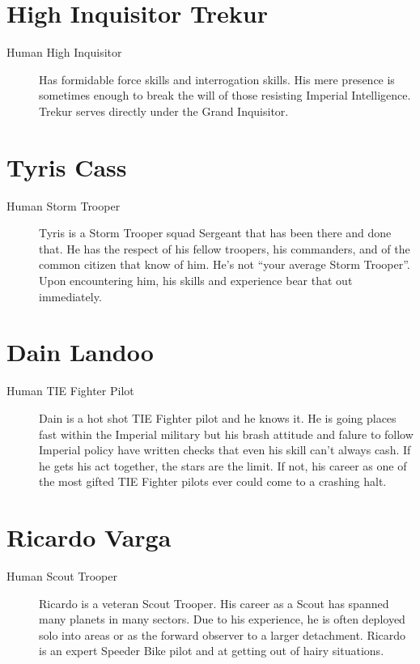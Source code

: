 \documentclass{article}
\begin{document}
\section{High Inquisitor Trekur}
\begin{description}
	\item [Human \male High Inquisitor] Has formidable force skills and interrogation skills. His mere presence is sometimes enough to break the will of those resisting Imperial Intelligence. Trekur serves directly under the Grand Inquisitor.
\end{description}
\section{Tyris Cass}
\begin{description}
	\item [Human \male Storm Trooper] Tyris is a Storm Trooper squad Sergeant that has been there and done that. He has the respect of his fellow troopers, his commanders, and of the common citizen that know of him. He’s not “your average Storm Trooper”. Upon encountering him, his skills and experience bear that out immediately.
\end{description}
\section{Dain Landoo}
\begin{description}
	\item [Human \male TIE Fighter Pilot] Dain is a hot shot TIE Fighter pilot and he knows it. He is going places fast within the Imperial military but his brash attitude and falure to follow Imperial policy have written checks that even his skill can’t always cash. If he gets his act together, the stars are the limit. If not, his career as one of the most gifted TIE Fighter pilots ever could come to a crashing halt.
\end{description}
\section{Ricardo Varga}
\begin{description}
	\item [Human \male Scout Trooper] Ricardo is a veteran Scout Trooper. His career as a Scout has spanned many planets in many sectors. Due to his experience, he is often deployed solo into areas or as the forward observer to a larger detachment. Ricardo is an expert Speeder Bike pilot and at getting out of hairy situations.
\end{description}
\end{document}

